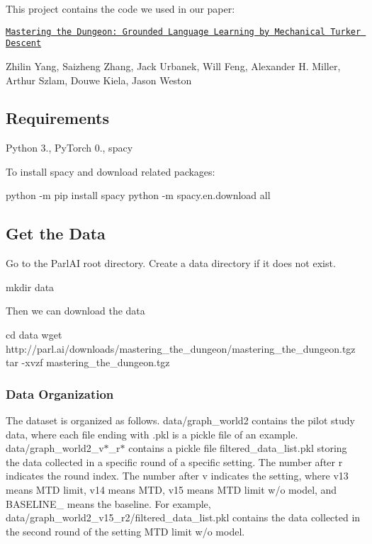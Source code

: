 This project contains the code we used in our paper\+:

\href{https://arxiv.org/abs/1711.07950}{\tt Mastering the Dungeon\+: Grounded Language Learning by Mechanical Turker Descent}

Zhilin Yang, Saizheng Zhang, Jack Urbanek, Will Feng, Alexander H. Miller, Arthur Szlam, Douwe Kiela, Jason Weston

\subsection*{Requirements}

Python 3., Py\+Torch 0., spacy

To install {\ttfamily spacy} and download related packages\+: 
\begin{DoxyCode}
python -m pip install spacy
python -m spacy.en.download all
\end{DoxyCode}


\subsection*{Get the Data}

Go to the Parl\+AI root directory. Create a data directory if it does not exist. 
\begin{DoxyCode}
mkdir data
\end{DoxyCode}


Then we can download the data 
\begin{DoxyCode}
cd data
wget http://parl.ai/downloads/mastering\_the\_dungeon/mastering\_the\_dungeon.tgz
tar -xvzf mastering\_the\_dungeon.tgz
\end{DoxyCode}


\subsubsection*{Data Organization}

The dataset is organized as follows. {\ttfamily data/graph\+\_\+world2} contains the pilot study data, where each file ending with {\ttfamily .pkl} is a pickle file of an example. {\ttfamily data/graph\+\_\+world2\+\_\+v$\ast$\+\_\+r$\ast$} contains a pickle file {\ttfamily filtered\+\_\+data\+\_\+list.\+pkl} storing the data collected in a specific round of a specific setting. The number after {\ttfamily r} indicates the round index. The number after {\ttfamily v} indicates the setting, where {\ttfamily v13} means {\ttfamily M\+TD limit}, {\ttfamily v14} means {\ttfamily M\+TD}, {\ttfamily v15} means {\ttfamily M\+TD limit w/o model}, and {\ttfamily B\+A\+S\+E\+L\+I\+N\+E\+\_} means the baseline. For example, {\ttfamily data/graph\+\_\+world2\+\_\+v15\+\_\+r2/filtered\+\_\+data\+\_\+list.\+pkl} contains the data collected in the second round of the setting {\ttfamily M\+TD limit w/o model}.

